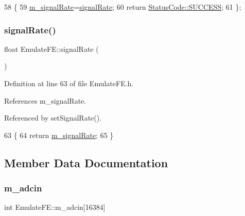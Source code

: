 \begin{DoxyCode}
58                                              \{
59     \hyperlink{classEmulateFE_a7aeff9e62f850ca6d7ee27dce02a060b}{m\_signalRate}=\hyperlink{classEmulateFE_a98d2e402e4707109ca14ee9f4d95c2fa}{signalRate};
60     \textcolor{keywordflow}{return} \hyperlink{classStatusCode_a6f565cbeadc76d14c72f047e5e85eb4badd0da38d3ba0d922efd1f4619bc37ad8}{StatusCode::SUCCESS};
61   \};
\end{DoxyCode}
\mbox{\label{classEmulateFE_a98d2e402e4707109ca14ee9f4d95c2fa}} 
\subsubsection{\texorpdfstring{signal\+Rate()}{signalRate()}}
{\footnotesize\ttfamily float Emulate\+F\+E\+::signal\+Rate (\begin{DoxyParamCaption}{ }\end{DoxyParamCaption})\hspace{0.3cm}{\ttfamily [inline]}}



Definition at line 63 of file Emulate\+F\+E.\+h.



References m\+\_\+signal\+Rate.



Referenced by set\+Signal\+Rate().


\begin{DoxyCode}
63                     \{
64     \textcolor{keywordflow}{return} \hyperlink{classEmulateFE_a7aeff9e62f850ca6d7ee27dce02a060b}{m\_signalRate};
65   \}
\end{DoxyCode}


\subsection{Member Data Documentation}
\mbox{\label{classEmulateFE_a647be38c790d5c0088e971aa28989589}} 
\subsubsection{\texorpdfstring{m\+\_\+adcin}{m\_adcin}}
{\footnotesize\ttfamily int Emulate\+F\+E\+::m\+\_\+adcin\mbox{[}16384\mbox{]}\hspace{0.3cm}{\ttfamily [private]}}



